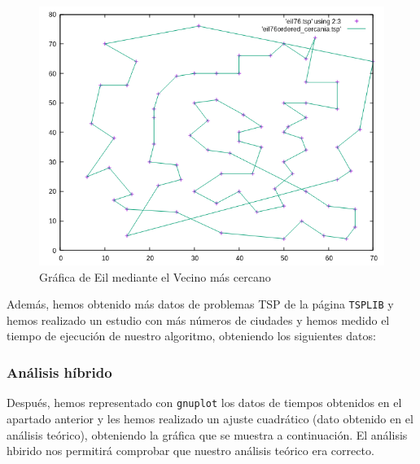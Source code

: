 \documentclass[10pt,a4paper]{article}
\begin{document}
\begin{itemize}
	\begin{figure}[h!]
	\centering
	\includegraphics[scale=0.5]{./Images/eil_cercania.png}
	\caption{Gráfica de Eil mediante el Vecino más cercano}
	\end{figure}
\end{itemize}

Además, hemos obtenido más datos de problemas TSP de la página \texttt{TSPLIB} y hemos realizado un estudio con más números de ciudades y hemos medido el tiempo de ejecución de nuestro algoritmo, obteniendo los siguientes datos:


 \begin{table}[h!]
 	\centering
 	\footnotesize
 	\caption{Experiencia empírica de el vecino más cercano}
 \end{table}

\subsubsection*{Análisis híbrido}

Después, hemos representado con \texttt{gnuplot} los datos de tiempos obtenidos en el apartado anterior y les hemos realizado un ajuste cuadrático (dato obtenido en el análisis teórico), obteniendo la gráfica que se muestra a continuación. El análisis hbirido nos permitirá comprobar que nuestro análisis teórico era correcto. 
\end{document}
